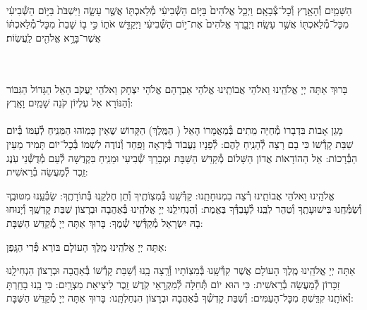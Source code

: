 \documentclass[twoside, openany, parskip=half, 11pt]{book}
\begin{document}
\tachanunim


\label{vayachulu}
\\
 הַשָּׁמַ֥יִם וְ֯הָאָ֖רֶץ וְ֯כׇל־צְ֯בָאָֽם׃ וַיְכַ֤ל אֱלֹהִים֙ בַּיּ֣וֹם הַשְּׁ֯בִיעִ֔י מְ֯לַאכְתּ֖וֹ אֲשֶׁ֣ר עָשָׂ֑ה וַיִּשְׁבֹּת֙ בַּיּ֣וֹם הַשְּׁ֯בִיעִ֔י מִכׇּל־מְ֯לַאכְתּ֖וֹ אֲשֶׁ֥ר עָשָֽׂה׃ וַיְבָ֤רֶךְ אֱלֹהִים֙ אֶת־י֣וֹם הַשְּׁ֯בִיעִ֔י וַיְקַדֵּ֖שׁ אֹת֑וֹ כִּ֣י ב֤וֹ שָׁבַת֙ מִכׇּל־מְ֯לַאכְתּ֔וֹ אֲשֶׁר־בָּרָ֥א אֱלֹהִ֖ים לַֽעֲשֽׂוֹת׃


\\
\\
בָּרוּךְ אַתָּה יְיָ אֱלֹהֵֽינוּ וֵאלֹהֵי אֲבוֹתֵֽינוּ אֱלֹהֵי אַבְרָהָם אֱלֹהֵי יִצְחָק וֵאלֹהֵי יַעֲקֹב הָאֵל הַגָּדוֹל הַגִּבּוֹר וְ֯הַנּוֹרָא אֵל עֶלְיוֹן קֹנֵה שָׁמַֽיִם וָאָֽרֶץ:\\
\\

מָגֵן אָבוֹת בִּדְבָרוֹ מְ֯חַיֵּה מֵתִים בְּ֯מַאֲמָרוֹ הָאֵל
( הַמֶּֽלֶךְ)
הַקָּדוֹשׁ שֶׁאֵין כָּמֽוֹהוּ הַמֵּנִֽיחַ לְ֯עַמּוֹ בְּ֯יוֹם שַׁבַּת קָדְ֯שׁוֹ כִּי בָם רָצָה לְ֯הָנִֽיחַ לָהֶם: לְ֯פָנָיו נַעֲבוֹד בְּ֯יִרְאָה וָפַֽחַד וְ֯נוֹדֶה לִשְׁמוֹ בְּ֯כׇל־יוֹם תָּמִיד מֵעֵין הַבְּ֯רָכוֹת: אֵל הַהוֹדָאוֹת אֲדוֹן הַשָּׁלוֹם מְ֯קַדֵּשׁ הַשַּׁבָּת וּמְבָרֵךְ שְׁ֯בִיעִי וּמֵנִֽיחַ בִּקְדֻשָּׁה לְ֯עַם מְ֯דֻשְּׁ֯נֵי עֹֽנֶג זֵֽכֶר לְ֯מַעֲשֵׂה בְ֯רֵאשִׁית:

אֱלֹהֵֽינוּ וֵאלֹהֵי אֲבוֹתֵֽינוּ רְ֯צֵה בִמְנוּחָתֵֽנוּ: קַדְּ֯שֵֽׁנוּ בְּ֯מִצְוֹתֶֽיךָ וְ֯תֵן חֶלְקֵֽנוּ בְּ֯תוֹרָתֶֽךָ: שַׂבְּ֯עֵֽנוּ מִטּוּבֶֽךָ וְ֯שַׂמְּ֯חֵֽנוּ בִּישׁוּעָתֶֽךָ וְ֯טַהֵר לִבֵּֽנוּ לְ֯עׇבְדְּ֯ךָ בֶּאֱמֶת: וְ֯הַנְחִילֵֽנוּ יְיָ אֱלֹהֵֽינוּ בְּ֯אַהֲבָה וּבְרָצוֹן שַׁבַּת קׇדְשֶֽׁךָ וְ֯יָנוּחוּ בָהּ יִשְׂרָאֵל מְ֯קַדְּ֯שֵׁי שְׁ֯מֶךָ: בָּרוּךְ אַתָּה יְיָ מְ֯קַדֵּשׁ הַשַּׁבָּת:

\fullkaddish


אַתָּה יְיָ אֱלֹהֵֽינוּ מֶֽלֶךְ הָעוֹלָם בּוֹרֵא פְּ֯רִי הַגָּֽפֶן:

אַתָּה יְיָ אֱלֹהֵֽינוּ מֶֽלֶךְ הָעוֹלָם אֲשֶׁר קִדְּ֯שָֽׁנוּ בְּ֯מִצְוֹתָיו וְ֯רָֽצָה בָֽנוּ וְ֯שַׁבַּת קָדְ֯שׁוֹ בְּ֯אַהֲבָה וּבְרָצוֹן הִנְחִילָֽנוּ זִכָּרוֹן לְ֯מַעֲשֵׂה בְ֯רֵאשִׁית: כִּי הוּא יוֹם תְּ֯חִלָּה לְ֯מִקְרָאֵי קֹֽדֶשׁ זֵֽכֶר לִיצִיאַת מִצְרָֽיִם: כִּי בָֽנוּ בָחַֽרְתָּ וְ֯אוֹתָֽנוּ קִדַּֽשְׁתָּ מִכׇּל־הָעַמִּים: וְ֯שַׁבַּת קׇדְשְׁ֯ךָ בְּ֯אַהֲבָה וּבְרָצוֹן הִנְחַלְתָּֽנוּ: בָּרוּךְ אַתָּה יְיָ מְ֯קַדֵּשׁ הַשַּׁבָּת:
\end{document}

